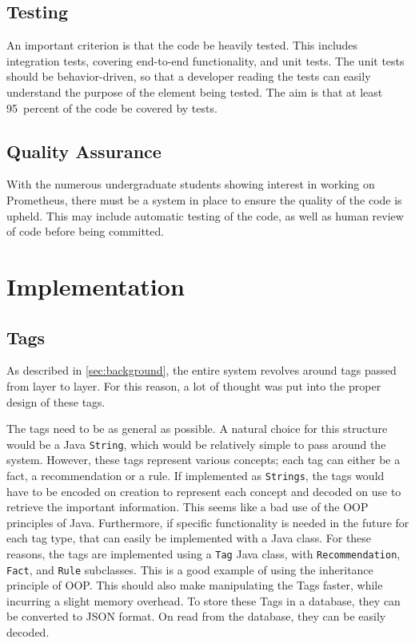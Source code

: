 \documentclass[titlepage,11pt]{article}
\newcommand{\code}[1]{\texttt{#1}}
\begin{document}
\subsection{Testing}
An important criterion is that the code be heavily tested. This includes integration tests, covering end-to-end functionality, and unit tests. The unit tests should be behavior-driven, so that a developer reading the tests can easily understand the purpose of the element being tested. The aim is that at least \SI{95}{percent} of the code be covered by tests.

\subsection{Quality Assurance}
With the numerous undergraduate students showing interest in working on Prometheus, there must be a system in place to ensure the quality of the code is upheld. This may include automatic testing of the code, as well as human review of code before being committed.

\section{Implementation}
\label{sec:implementation}

\subsection{Tags}

As described in \autoref{sec:background}, the entire system revolves around tags passed from layer to layer. For this reason, a lot of thought was put into the proper design of these tags.

The tags need to be as general as possible. A natural choice for this structure would be a Java \code{String}, which would be relatively simple to pass around the system. However, these tags represent various concepts; each tag can either be a fact, a recommendation or a rule. If implemented as \code{Strings}, the tags would have to be encoded on creation to represent each concept and decoded on use to retrieve the important information. This seems like a bad use of the OOP principles of Java. Furthermore, if specific functionality is needed in the future for each tag type, that can easily be implemented with a Java class. For these reasons, the tags are implemented using a \code{Tag} Java class, with \code{Recommendation}, \code{Fact}, and \code{Rule} subclasses. This is a good example of using the inheritance principle of OOP. This should also make manipulating the Tags faster, while incurring a slight memory overhead. To store these Tags in a database, they can be converted to JSON format. On read from the database, they can be easily decoded.
\end{document}
